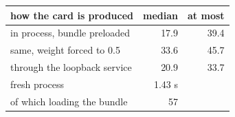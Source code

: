 \begin{tabular}{lrr}
\toprule
how the card is produced & median & at most \\
\midrule
in process, bundle preloaded & 17.9 & 39.4 \\
same, weight forced to 0.5 & 33.6 & 45.7 \\
through the loopback service & 20.9 & 33.7 \\
fresh process & 1.43 s &  \\
of which loading the bundle & 57 &  \\
\bottomrule
\end{tabular}
